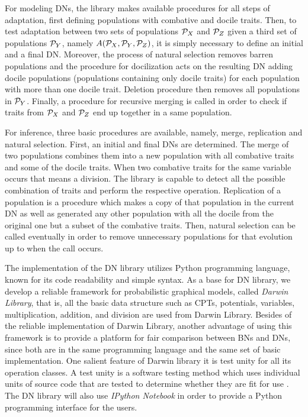 For modeling DNs, the library makes available procedures for all steps of adaptation, first defining populations with combative and docile traits.
Then, to test adaptation between two sets of populations ${\cal P}_X$ and ${\cal P}_Z$ given a third set of populations ${\cal P}_Y$, namely $A({\cal P}_X, {\cal P}_Y, {\cal P}_Z)$, it is simply necessary to define an initial and a final DN.
Moreover, the process of natural selection removes barren populations and the procedure for docilization acts on the resulting DN adding docile populations (populations containing only docile traits) for each population with more than one docile trait.
Deletion procedure then removes all populations in ${\cal P}_Y$.
Finally, a procedure for recursive merging is called in order to check if traits from ${\cal P}_X$ and ${\cal P}_Z$ end up together in a same population.

For inference, three basic procedures are available, namely, merge, replication and natural selection.
First, an initial and final DNs are determined.
The merge of two populations combines them into a new population with all combative traits and some of the docile traits.
When two combative traits for the same variable occurs that means a division.
The library is capable to detect all the possible combination of traits and perform the respective operation.
Replication of a population is a procedure which makes a copy of that population in the current DN as well as generated any other population with all the docile from the original one but a subset of the combative traits.
Then, natural selection can be called eventually in order to remove unnecessary populations for that evolution up to when the call occurs.

The implementation of the DN library utilizes Python programming language, known for its code readability and simple syntax.
As a base for DN library, we develop a reliable framework for probabilistic graphical models, called \emph{Darwin Library}, that is, all the basic data structure such as CPTs, potentials, variables, multiplication, addition, and division are used from Darwin Library.
Besides of the reliable implementation of Darwin Library, another advantage of using this framework is to provide a platform for fair comparison between BNs and DNs, since both are in the same programming language and the same set of basic implementation.
One salient feature of Darwin library it is test unity for all its operation classes.
A test unity is a software testing method which uses individual units of source code that are tested to determine whether they are fit for use \cite{kolawa2007automated}.
The DN library will also use \emph{IPython Notebook} \cite{PER-GRA:2007} in order to provide a Python programming interface for the users.

